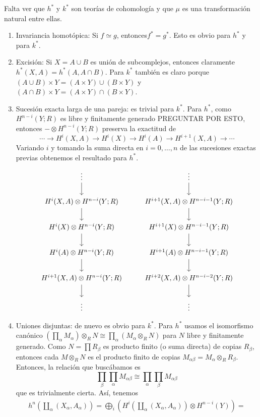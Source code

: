 \documentclass[TA.tex]{subfiles}
\begin{document}
\begin{dem}
Falta ver que $h^*$ y $k^*$ son teorías de cohomología y que $\mu$ es una transformación natural entre ellas. 

\begin{enumerate}
\item Invariancia homotópica: Si $f\simeq g$, entonces$f^*=g^*$. Esto es obvio para $h^*$ y para $k^*$. 
\item Excisión: Si $X=A\cup B$ es unión de subcomplejos, entonces claramente $h^*(X,A)=h^*(A,A\cap B)$. Para $k^*$ también es claro porque $(A\cup B)\times Y=(A\times Y)\cup (B\times Y)$ y $(A\cap B)\times Y=(A\times Y)\cap (B\times Y)$. 
\item Sucesión exacta larga de una pareja: es trivial para $k^*$. Para $h^*$, como $H^{n-i}(Y;R)$ es libre y finitamente generado PREGUNTAR POR ESTO, entonces $-\otimes H^{n-i}(Y;R)$ preserva la exactitud de 
\[
\cdots\to H^i(X,A)\to H^i(X)\to H^i(A)\to H^{i+1}(X,A)\to\cdots
\]
Variando $i$ y tomando la suma directa en $i=0,\dots, n$ de las sucesiones exactas previas obtenemos el resultado para $h^*$. 
\[
\begin{tikzcd}
\vdots \arrow[d] & \vdots \arrow[d] \\
{H^i(X,A)\otimes H^{n-i}(Y;R) } \arrow[d] & {H^{i+1}(X,A)\otimes H^{n-i-1}(Y;R)} \arrow[d] \\
H^i(X)\otimes H^{n-i}(Y;R) \arrow[d] & H^{i+1}(X)\otimes H^{n-i-1}(Y;R) \arrow[d] \\
H^i(A)\otimes H^{n-i}(Y;R) \arrow[d] & H^{i+1}(A)\otimes H^{n-i-1}(Y;R) \arrow[d] \\
{H^{i+1}(X,A)\otimes H^{n-i}(Y;R)} \arrow[d] & {H^{i+2}(X,A)\otimes H^{n-i-2}(Y;R)} \arrow[d] \\
\vdots & \vdots
\end{tikzcd}
\]
\item Uniones disjuntas: de nuevo es obvio para $k^*$. Para $h^*$ usamos el isomorfismo canónico $(\prod_\alpha M_\alpha)\otimes_R N\cong \prod_\alpha (M_\alpha\otimes_R N)$ para $N$ libre y finitamente generado. Como $N=\prod R_\beta$ es producto finito (o suma directa) de copias $R_\beta$, entonces cada $M\otimes_R N$ es el producto finito de copias $M_{\alpha\beta}=M_\alpha\otimes_R R_\beta$. Entonces, la relación que buscábamos es
\[
\prod_\beta\prod_\alpha M_{\alpha\beta}\cong\prod_\alpha\prod_\beta M_{\alpha\beta}
\]
que es trivialmente cierta. Así, tenemos
\begin{gather*}
h^n\left(\coprod_\alpha(X_\alpha, A_\alpha)\right)=\bigoplus_i\left(H^i\left(\coprod_\alpha(X_\alpha, A_\alpha)\right)\otimes H^{n-i}(Y)\right)=\\

\end{gather*}
\end{enumerate}
\end{dem}
\end{document}
